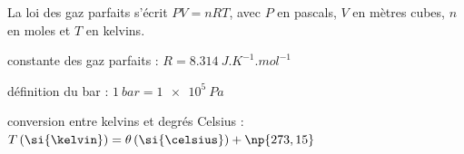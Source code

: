 \debutFicheEntrainement                                                                      %


\begin{prerequis}
La loi des gaz parfaits s'écrit $PV=nRT$, avec $P$ en pascals, $V$ en mètres cubes, $n$ en moles et $T$ en kelvins.

\constantesUtiles
\begin{listeConstantes}
	\item constante des gaz parfaits : $R=\SI{8,314}{J.K^{-1}.mol^{-1}}$
	\item définition du bar : $\SI{1}{bar}=\SI{1e5}{Pa}$
	\item conversion entre kelvins et degrés Celsius : $T\,(\si{\kelvin}) = \theta\, (\si{\celsius}) + \np{273,15}$
\end{listeConstantes}
\end{prerequis}











